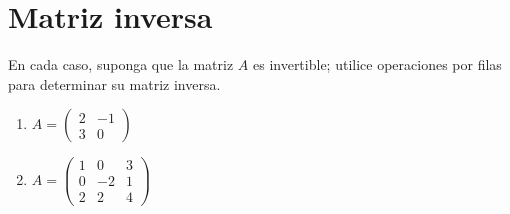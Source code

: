 \documentclass[a4,11pt]{aleph-notas}
\begin{document}
\encabezado

\section{Matriz inversa}

\begin{ejer}
    En cada caso, suponga que la matriz $A$ es invertible; utilice operaciones por filas para determinar su matriz inversa.
    \begin{enumerate}
        \item $A = \begin{pmatrix}
                2 & -1\\ 3 & 0
            \end{pmatrix}$
        \item $A = \begin{pmatrix}
                1 & 0 & 3\\ 0 & -2 &  1 \\ 2 & 2 & 4
            \end{pmatrix}$
    \end{enumerate}
\end{ejer}
\end{document}
